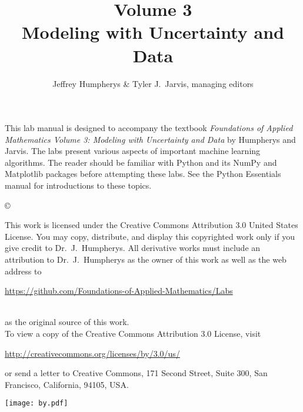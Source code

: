 \documentclass[opener-c,labs,yellow,nociteref]{HJnewsiambook}
\title{Volume 3\\ Modeling with Uncertainty and Data}
\author{Jeffrey Humpherys \& Tyler J.~Jarvis, managing editors}
\begin{document}

\newif\ifbyu
\byutrue
\byufalse %

\thispagestyle{empty} %
\maketitle
\thispagestyle{empty}
\frontmatter



\begin{thepreface} %

This lab manual is designed to accompany the textbook \emph{Foundations of Applied Mathematics Volume 3: Modeling with Uncertainty and Data} by Humpherys and Jarvis.
The labs present various aspects of important machine learning algorithms.
The reader should be familiar with Python \cite{vanrossum2010python} and its NumPy \cite{oliphant2006guide,ascher2001numerical,oliphant2007python} and Matplotlib \cite{Hunter:2007} packages before attempting these labs.
See the Python Essentials manual for introductions to these topics.

\vfill
\copyright{This work is licensed under the Creative Commons Attribution 3.0 United States License.
You may copy, distribute, and display this copyrighted work only if you give credit to Dr.~J.~Humpherys.
All derivative works must include an attribution to Dr.~J.~Humpherys as the owner of this work as well as the web address to
\\
\centerline{\url{https://github.com/Foundations-of-Applied-Mathematics/Labs}}
\\
as the original source of this work.
\\
To view a copy of the Creative Commons Attribution 3.0 License, visit
\\
\centerline{\url{http://creativecommons.org/licenses/by/3.0/us/}}
or send a letter to Creative Commons, 171 Second Street, Suite 300, San Francisco, California, 94105, USA.}

\vfill
\centering\texttt{[image: by.pdf]}
\vfill
\end{thepreface}

\setcounter{tocdepth}{1}
\tableofcontents

\mainmatter %
\end{document}
